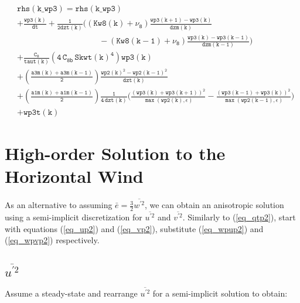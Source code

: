 \documentclass[11pt,fleqn]{article}
\begin{document}
\begin{equation}
\begin{split}
& \mathtt{ rhs(k\_wp3) = rhs(k\_wp3) } \\
& \mathtt{
  + \frac{wp3(k)}{dt} 
  + \frac{1}{2dzt(k)}
      \bigg(
              \left(Kw8(k)+\nu_8\right)
              \frac{wp3(k+1)-wp3(k)}{dzm(k)} }  \\
& \mathtt{ \qquad \qquad \qquad \qquad \qquad
            - \left(Kw8(k-1)+\nu_8\right)
              \frac{wp3(k)-wp3(k-1)}{dzm(k-1)}
      \bigg)
  } \\
& \mathtt{
+ \frac{C_8}{taut(k)}
   \left( 4 \, C_{8b} \, {Skwt(k)}^4 \right) wp3(k)
  } \\
& \mathtt{
  + \left(\frac{a3m(k)+a3m(k-1)}{2}\right) \frac{wp2(k)^2 - wp2(k-1)^2 }
                                                {dzt(k)}
  } \\
& \mathtt{
  + \left(\frac{a1m(k)+a1m(k-1)}{2}\right) \frac{1}{4 \, dzt(k)}
    \bigg(
      \frac{ \left(wp3(k)+wp3(k+1)\right)^2 }
           { \max\left( wp2(k), \epsilon \right) }
     -\frac{ \left(wp3(k-1)+wp3(k)\right)^2 }
           { \max\left( wp2(k-1), \epsilon \right) }
    \bigg)
  } \\
& \mathtt{
+ wp3t(k)
  }
\end{split}
\end{equation}

\section{High-order Solution to the Horizontal Wind}
As an alternative to assuming $\bar{e} = \frac{3}{2}\overline{w^{'2}}$, 
we can obtain an anisotropic solution using a semi-implicit discretization for 
$\overline{u^{'2}}$ and $\overline{v^{'2}}$.
Similarly to (\ref{eq_qtp2}), start with equations (\ref{eq_up2}) and 
(\ref{eq_vp2}), substitute (\ref{eq_wpup2}) and (\ref{eq_wpvp2}) respectively.

\subsection{$\overline{u^{'2}}$}
Assume a steady-state and rearrange $\overline{u^{'2}}$ for a semi-implicit
solution to obtain:
\end{document}
